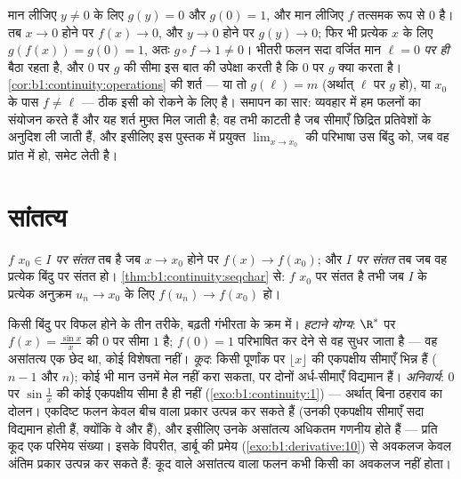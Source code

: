 \begin{example}[संयोजन की शर्त क्यों है]\label{ex:b1:continuity:compositiontrap}
मान लीजिए $y \neq 0$ के लिए $g(y) = 0$ और $g(0) = 1$, और मान लीजिए $f$
तत्समक रूप से $0$ है। तब $x \to 0$ होने पर $f(x) \to 0$, और $y \to 0$ होने
पर $g(y) \to 0$; फिर भी प्रत्येक $x$ के लिए $g(f(x)) = g(0) = 1$, अतः $g
\circ f \to 1 \neq 0$। भीतरी फलन सदा वर्जित मान $\ell = 0$ \emph{पर ही} बैठा
रहता है, और $0$ पर $g$ की सीमा इस बात की उपेक्षा करती है कि $0$ पर $g$ क्या
करता है। \cref{cor:b1:continuity:operations} की शर्त --- या तो $g(\ell) = m$
(अर्थात् $\ell$ पर $g$  हो), या $x_0$ के पास $f \neq \ell$ --- ठीक इसी
को रोकने के लिए है। समापन का सार: व्यवहार में हम \emph{} फलनों का संयोजन
करते हैं और यह शर्त मुफ़्त मिल जाती है; वह तभी काटती है जब सीमाएँ छिद्रित
प्रतिवेशों के अनुदिश ली जाती हैं, और इसीलिए इस पुस्तक में प्रयुक्त $\lim_{x
\to x_0}$ की परिभाषा उस बिंदु को, जब वह प्रांत में हो, समेट लेती है।
\end{example}

\section{सांतत्य}

\begin{definition}\label{def:b1:continuity:continuous}
$f$ \emph{$x_0 \in I$ पर संतत} तब है जब $x \to x_0$ होने पर
$f(x) \to f(x_0)$; और \emph{$I$ पर संतत} तब जब वह प्रत्येक बिंदु पर संतत हो।
\cref{thm:b1:continuity:seqchar} से: $f$ $x_0$ पर संतत है तभी जब $I$ के
प्रत्येक अनुक्रम $u_n \to x_0$ के लिए $f(u_n) \to f(x_0)$ हो।
\end{definition}

\begin{example}[असांतत्यों का वर्गीकरण]\label{ex:b1:continuity:taxonomy}
किसी बिंदु पर विफल होने के तीन तरीके, बढ़ती गंभीरता के क्रम में। \emph{हटाने
योग्य}: $\R^*$ पर $f(x) = \frac{\sin x}{x}$ की $0$ पर सीमा $1$ है; $f(0) =
1$ परिभाषित कर देने से वह सुधर जाता है --- वह असांतत्य एक छेद था, कोई
विशेषता नहीं। \emph{कूद}: किसी पूर्णांक पर $\lfloor x \rfloor$ की एकपक्षीय
सीमाएँ भिन्न हैं ($n - 1$ और $n$); कोई भी मान उनमें मेल नहीं करा सकता, पर
दोनों अर्ध-सीमाएँ विद्यमान हैं। \emph{अनिवार्य}: $0$ पर $\sin\frac1x$ की कोई
एकपक्षीय सीमा है ही नहीं (\cref{exo:b1:continuity:1}) --- अर्थात् बिना ठहराव
का दोलन। एकदिष्ट फलन केवल बीच वाला प्रकार उत्पन्न कर सकते हैं (उनकी एकपक्षीय
सीमाएँ सदा विद्यमान होती हैं, क्योंकि वे  और  हैं), और इसीलिए
उनके असांतत्य  अधिकतम गणनीय होते हैं --- प्रति कूद एक परिमेय संख्या।
इसके विपरीत, डार्बू की प्रमेय (\cref{exo:b1:derivative:10}) से अवकलज केवल
अंतिम प्रकार उत्पन्न कर सकते हैं: कूद वाले असांतत्य वाला फलन कभी किसी का
अवकलज नहीं होता।
\end{example}

